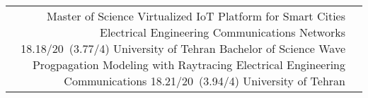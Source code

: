 \begin{supertabular}{rl}
    {Master of Science}
    {Virtualized IoT Platform for Smart Cities}
    {}
    {Electrical Engineering}
    {Communications Networks}
    {18.18/20~(3.77/4)}
    {University of Tehran}
    {Bachelor of Science}
    {Wave Progpagation Modeling with Raytracing}
    {Electrical Engineering}
    {Communications}
    {18.21/20~(3.94/4)}
    {}
    {University of Tehran}
\end{supertabular}
